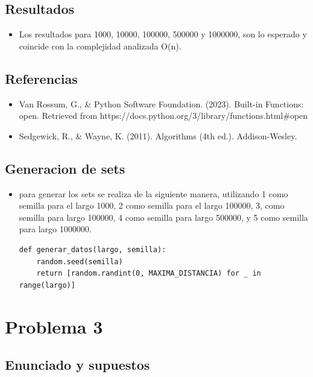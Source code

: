 \documentclass[a4paper, 12pt]{article}
\begin{document}
\subsection{Resultados}
\begin{itemize}
    \item Los resultados para 1000, 10000, 100000, 500000 y 1000000, son lo esperado 
     y coincide con la complejidad analizada O(n).
\end{itemize}

\subsection{Referencias}

\begin{itemize}
    \item Van Rossum, G., \& Python Software Foundation. (2023). Built-in Functions: open. Retrieved from https://docs.python.org/3/library/functions.html\#open
    \item Sedgewick, R., \& Wayne, K. (2011). Algorithms (4th ed.). Addison-Wesley.
\end{itemize}

\subsection{Generacion de sets}
\begin{itemize}
\item para generar los sets se realiza de la siguiente manera, utilizando 1 como semilla para el largo 1000, 2 como semilla para el largo 100000, 3, como semilla para largo 100000, 4 como semilla para largo 500000, y 5 como semilla para largo 1000000.

    \begin{lstlisting}[frame=single]
    def generar_datos(largo, semilla):
    random.seed(semilla)
    return [random.randint(0, MAXIMA_DISTANCIA) for _ in range(largo)]
\end{lstlisting}
\end{itemize}

\section{Problema 3}

\subsection{Enunciado y supuestos}
\end{document}
